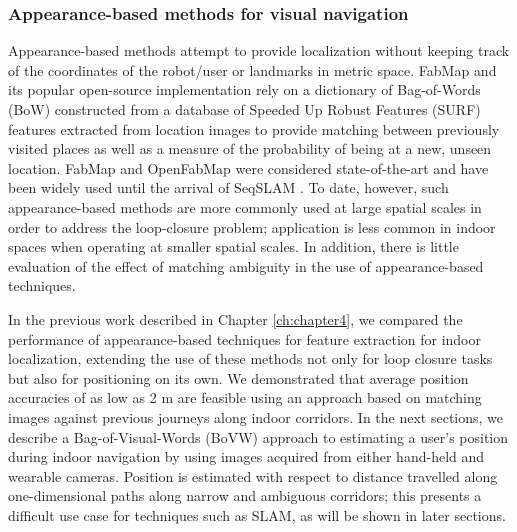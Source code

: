 \subsubsection{Appearance-based methods for visual navigation}
Appearance-based methods attempt to provide localization without keeping track of the coordinates of the robot/user or landmarks in metric space. FabMap \citep{cumminsFabMap2010} and its popular open-source implementation \citep{OpenFabMap2011} rely on a dictionary of Bag-of-Words (BoW) constructed from a database of Speeded Up Robust Features (SURF) features extracted from location images to provide matching between previously visited places as well as a measure of the probability of being at a new, unseen location. FabMap and OpenFabMap were considered state-of-the-art and have been widely used until the arrival of SeqSLAM \cite{SeqSLAM}. To date, however, such appearance-based methods are more commonly used at large spatial scales in order to address the loop-closure problem; application is less common  in indoor spaces when operating at smaller spatial scales. In addition, there is little evaluation of the effect of matching ambiguity in the use of appearance-based techniques. 

In the previous work \citep{RiveraWearable} described in Chapter \ref{ch:chapter4}, we compared the performance of appearance-based techniques for feature extraction for indoor localization, extending the use of these methods not only for loop closure tasks but also for positioning on its own. We demonstrated that average position accuracies of as low as 2 m are feasible using an approach based on matching images against previous journeys along indoor corridors.  In the next sections, we describe a Bag-of-Visual-Words (BoVW) approach to estimating a user's position during indoor navigation by using images acquired from either hand-held and wearable cameras.  Position is estimated with respect to distance travelled along one-dimensional paths along narrow and ambiguous corridors; this presents a difficult use case for techniques such as SLAM, as will be shown in later sections.

